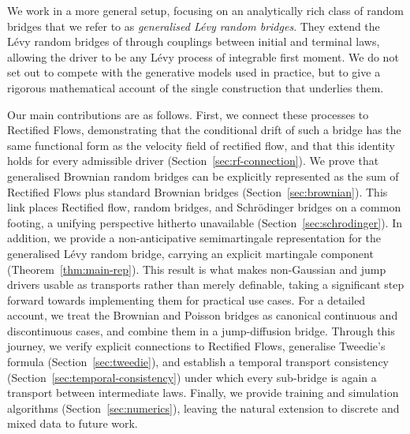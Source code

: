 \documentclass{article}
\newcommand{\levy}{{L\'evy }}
\newcommand{\Schrodinger}{Schr\"odinger\xspace}
\theoremstyle{definition}
\begin{document}
We work in a more general setup, focusing on an analytically rich class of random bridges that we refer to as \emph{generalised \levy random bridges}. They extend the \levy random bridges of \cite{hoylehughstonmacrina_2011} through couplings between initial and terminal laws, allowing the driver to be any \levy process of integrable first moment. We do not set out to compete with the generative models used in practice, but to give a rigorous mathematical account of the single construction that underlies them. 

Our main contributions are as follows. First, we connect these processes to Rectified Flows, demonstrating that the conditional drift of such a bridge has the same functional form as the velocity field of rectified flow, and that this identity holds for every admissible driver (Section~\ref{sec:rf-connection}). We prove that generalised Brownian random bridges can be explicitly represented as the sum of Rectified Flows plus standard Brownian bridges (Section~\ref{sec:brownian}). This link places Rectified flow, random bridges, and \Schrodinger bridges on a common footing, a unifying perspective hitherto unavailable (Section~\ref{sec:schrodinger}). In addition, we provide a non-anticipative semimartingale representation for the generalised \levy random bridge, carrying an explicit martingale component (Theorem~\ref{thm:main-rep}). This result is what makes non-Gaussian and jump drivers usable as transports rather than merely definable, taking a significant step forward towards implementing them for practical use cases. For a detailed account, we treat the Brownian and Poisson bridges as canonical continuous and discontinuous cases, and combine them in a jump-diffusion bridge. Through this journey, we verify explicit connections to Rectified Flows, generalise Tweedie's formula (Section~\ref{sec:tweedie}), and establish a temporal transport consistency (Section~\ref{sec:temporal-consistency}) under which every sub-bridge is again a transport between intermediate laws. Finally, we provide training and simulation algorithms (Section~\ref{sec:numerics}), leaving the natural extension to discrete and mixed data to future work.
\end{document}
